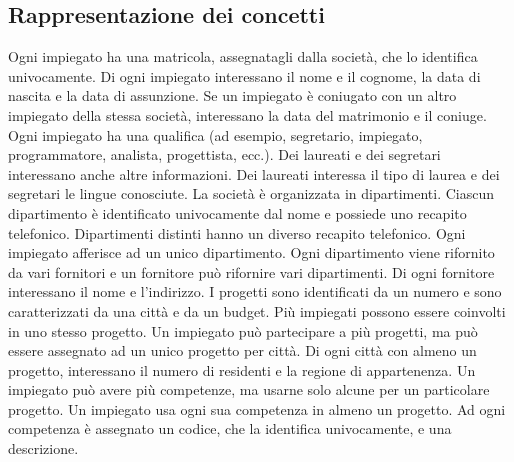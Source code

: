 \documentclass{article}
\begin{document}
\subsection{Rappresentazione dei concetti}
Ogni {\color{red} impiegato} ha una {\color{magenta}matricola}, assegnatagli dalla società, che lo identifica univocamente.
\newline
Di ogni impiegato interessano il {\color{magenta}nome} e il {\color{magenta}cognome}, la {\color{magenta}data di nascita} e la {\color{magenta}data di assunzione}.
\newline
Se un impiegato è {\color{blue}coniugato} con un altro impiegato della stessa società, interessano la {\color{teal}data del matrimonio} e il coniuge.
\newline
Ogni impiegato ha una {\color{magenta}qualifica} (ad esempio, segretario, impiegato, programmatore, analista, progettista, ecc.).
\newline
Dei {\color{orange}laureati} e dei {\color{orange}segretari} interessano anche altre informazioni.
\newline
Dei laureati interessa il {\color{magenta}tipo di laurea} e dei segretari le {\color{magenta}lingue conosciute}.
\newline
\newline
La società è organizzata in {\color{red} dipartimenti}.
\newline
Ciascun dipartimento è identificato univocamente dal {\color{magenta}nome} e possiede uno {\color{magenta}recapito telefonico}.
\newline
Dipartimenti distinti hanno un diverso recapito telefonico.
\newline
Ogni impiegato {\color{blue}afferisce} ad un unico dipartimento. 
\newline
Ogni dipartimento viene {\color{blue}rifornito} da vari {\color{red} fornitori} e un fornitore può rifornire vari dipartimenti.
\newline
Di ogni fornitore interessano il {\color{magenta}nome} e l’{\color{magenta}indirizzo}.
\newline
\newline
I {\color{red} progetti} sono identificati da un {\color{magenta}numero} e sono caratterizzati da una {\color{blue}città} e da un {\color{magenta}budget}.
\newline
Più impiegati possono essere coinvolti in uno stesso progetto.
\newline
Un impiegato può {\color{blue}partecipare} a più progetti, ma può essere assegnato ad un unico progetto per {\color{red} città}.
\newline
Di ogni città con almeno un progetto, interessano il {\color{magenta}numero} di residenti e la {\color{magenta}regione} di appartenenza.
\newline
Un impiegato può {\color{blue}avere} più {\color{red} competenze}, ma usarne solo alcune per un particolare progetto.
\newline
Un impiegato usa ogni sua competenza in almeno un progetto.
\newline
Ad ogni competenza è assegnato un {\color{magenta}codice}, che la identifica univocamente, e una {\color{magenta}descrizione}.
\end{document}
